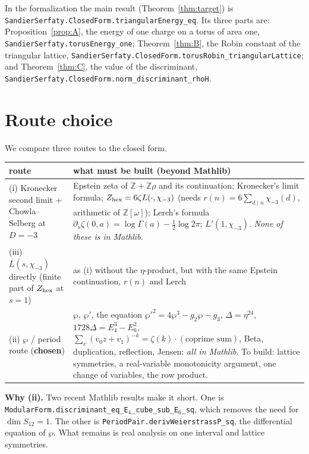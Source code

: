 \documentclass[11pt]{article}
\theoremstyle{definition}
\theoremstyle{remark}
\newcommand{\Z}{\mathbb Z}
\newcommand{\lean}[1]{\texttt{#1}}
\begin{document}
In the formalization the main result (Theorem~\ref{thm:target}) is \lean{SandierSerfaty.ClosedForm.triangularEnergy\_eq}.
Its three parts are: Proposition~\ref{prop:A}, the energy of one charge on a torus of area one,
\lean{SandierSerfaty.torusEnergy\_one}; Theorem~\ref{thm:B}, the Robin constant of the triangular lattice,
\lean{SandierSerfaty.ClosedForm.torusRobin\_triangularLattice}; and Theorem~\ref{thm:C}, the value of the discriminant,
\lean{SandierSerfaty.ClosedForm.norm\_discriminant\_rhoH}.

\tableofcontents

\section{Route choice}\label{sec:route}

We compare three routes to the closed form.

\begin{center}
\begin{tabular}{@{}p{3.4cm}p{10.9cm}@{}}
\toprule
route & what must be built (beyond Mathlib)\\
\midrule
(i) Kronecker second limit + Chowla--Selberg at $D=-3$ &
Epstein zeta of $\Z+\Z\rho$ and its continuation; Kronecker's limit formula; $Z_{\rm hex}=6\zeta L(\cdot,\chi_{-3})$
(needs $r(n)=6\sum_{d\mid n}\chi_{-3}(d)$, arithmetic of $\Z[\omega]$); Lerch's formula
$\partial_s\zeta(0,a)=\log\Gamma(a)-\tfrac12\log2\pi$; $L'(1,\chi_{-3})$. \emph{None of these is in Mathlib.}\\
(iii) $L(s,\chi_{-3})$ directly (finite part of $Z_{\rm hex}$ at $s=1$) &
as (i) without the $\eta$-product, but with the same Epstein continuation, $r(n)$ and Lerch\\
(ii) $\wp$ / period route (\textbf{chosen}) &
$\wp$, $\wp'$, the equation $\wp'^2=4\wp^3-g_2\wp-g_3$, $\Delta=\eta^{24}$, $1728\Delta=E_4^3-E_6^2$,
$\sum_v(v_0z+v_1)^{-k}=\zeta(k)\cdot(\text{coprime sum})$, Beta, duplication, reflection, Jensen:
\emph{all in Mathlib}. To build: lattice symmetries, a real-variable monotonicity argument,
one change of variables, the row product.\\
\bottomrule
\end{tabular}
\end{center}

\noindent\textbf{Why (ii).} Two recent Mathlib results make it short. One is
\lean{ModularForm.discriminant\_eq\_E$_4$\_cube\_sub\_E$_6$\_sq},
which removes the need for $\dim S_{12}=1$. The other is
\lean{PeriodPair.derivWeierstrassP\_sq},
the differential equation of $\wp$. What remains is real analysis on one interval and lattice symmetries.
\end{document}
